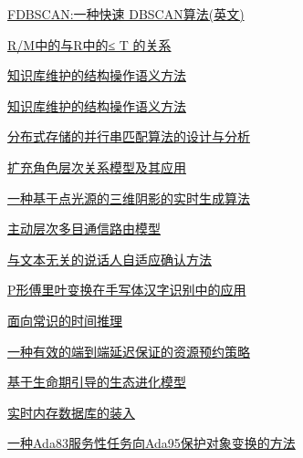 \documentclass[a4paper]{article}
\begin{document}
\href{http://www.jos.org.cn/ch/reader/download_pdf.aspx?file_no=20000604&year_id=2000&quarter_id=6&falg=1}{FDBSCAN:一种快速 DBSCAN算法(英文)}

\href{http://www.jos.org.cn/ch/reader/download_pdf.aspx?file_no=20000605&year_id=2000&quarter_id=6&falg=1}{R/M中的与R中的≤ T 的关系}

\href{http://www.jos.org.cn/ch/reader/download_pdf.aspx?file_no=20000607&year_id=2000&quarter_id=6&falg=1}{知识库维护的结构操作语义方法}

\href{http://www.jos.org.cn/ch/reader/download_pdf.aspx?file_no=20000608&year_id=2000&quarter_id=6&falg=1}{知识库维护的结构操作语义方法}

\href{http://www.jos.org.cn/ch/reader/download_pdf.aspx?file_no=20000609&year_id=2000&quarter_id=6&falg=1}{分布式存储的并行串匹配算法的设计与分析}

\href{http://www.jos.org.cn/ch/reader/download_pdf.aspx?file_no=20000610&year_id=2000&quarter_id=6&falg=1}{扩充角色层次关系模型及其应用}

\href{http://www.jos.org.cn/ch/reader/download_pdf.aspx?file_no=20000611&year_id=2000&quarter_id=6&falg=1}{一种基于点光源的三维阴影的实时生成算法}

\href{http://www.jos.org.cn/ch/reader/download_pdf.aspx?file_no=20000612&year_id=2000&quarter_id=6&falg=1}{主动层次多目通信路由模型}

\href{http://www.jos.org.cn/ch/reader/download_pdf.aspx?file_no=20000613&year_id=2000&quarter_id=6&falg=1}{与文本无关的说话人自适应确认方法}

\href{http://www.jos.org.cn/ch/reader/download_pdf.aspx?file_no=20000614&year_id=2000&quarter_id=6&falg=1}{P形傅里叶变换在手写体汉字识别中的应用}

\href{http://www.jos.org.cn/ch/reader/download_pdf.aspx?file_no=20000615&year_id=2000&quarter_id=6&falg=1}{面向常识的时间推理}

\href{http://www.jos.org.cn/ch/reader/download_pdf.aspx?file_no=20000616&year_id=2000&quarter_id=6&falg=1}{一种有效的端到端延迟保证的资源预约策略}

\href{http://www.jos.org.cn/ch/reader/download_pdf.aspx?file_no=20000617&year_id=2000&quarter_id=6&falg=1}{基于生命期引导的生态进化模型}

\href{http://www.jos.org.cn/ch/reader/download_pdf.aspx?file_no=20000619&year_id=2000&quarter_id=6&falg=1}{实时内存数据库的装入}

\href{http://www.jos.org.cn/ch/reader/download_pdf.aspx?file_no=20000620&year_id=2000&quarter_id=6&falg=1}{一种Ada83服务性任务向Ada95保护对象变换的方法}
\end{document}
